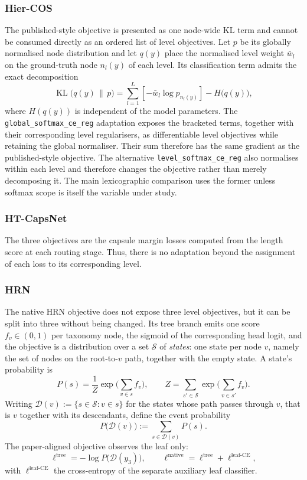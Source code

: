 \subsubsection{Hier-COS}
The published-style objective is presented
as one node-wide KL term and cannot be consumed directly as an ordered list of
level objectives. Let $p$ be its globally normalised node distribution and let
$q(y)$ place the normalised level weight $\bar w_l$ on the ground-truth node
$n_l(y)$ of each level. Its classification term admits the exact decomposition
\[
\operatorname{KL}\!\big(q(y)\,\|\,p\big)
=\sum_{l=1}^{L}\left[-\bar w_l\log p_{n_l(y)}\right]-H\!\big(q(y)\big),
\]
where $H(q(y))$ is independent of the model parameters. The
\texttt{global\_\allowbreak softmax\_\allowbreak ce\_\allowbreak reg} adaptation exposes the bracketed terms, together
with their corresponding level regularisers, as differentiable level
objectives while retaining the global normaliser. Their sum therefore has the
same gradient as the published-style objective. The alternative
\texttt{level\_softmax\_ce\_reg} also normalises within each level and therefore
changes the objective rather than merely decomposing it. The main
lexicographic comparison uses the former unless softmax scope is itself the
variable under study.

\subsubsection{HT-CapsNet}
The three objectives are the capsule margin
losses computed from the length score at each routing stage. Thus, there is no adaptation
beyond the assignment of each loss to its corresponding level.

\subsubsection{HRN}
The native HRN objective does not expose three level
objectives, but it can be split into three without being changed. Its tree
branch emits one score $f_v\in(0,1)$ per taxonomy node, the sigmoid of the
corresponding head logit, and the objective is a distribution over a set
$\mathcal{S}$ of \emph{states}: one state per node $v$, namely the set of nodes
on the root-to-$v$ path, together with the empty state. A state's probability is
\[
P(s)=\frac{1}{Z}\exp\Big(\sum_{v\in s} f_v\Big),\qquad
Z=\sum_{s'\in\mathcal{S}}\exp\Big(\sum_{v\in s'} f_{v}\Big).
\]
Writing $\mathcal{D}(v):=\{s\in\mathcal{S}:v\in s\}$ for the states whose path
passes through $v$, that is $v$ together with its descendants, define the event
probability
\[
P\bigl(\mathcal{D}(v)\bigr):=
\sum_{s\in\mathcal{D}(v)}P(s).
\]
The paper-aligned objective observes the leaf only:
\[
\ell^{\mathrm{tree}}=-\log P\big(\mathcal{D}(y_3)\big),
\qquad
\ell^{\mathrm{native}}=\ell^{\mathrm{tree}}+\ell^{\mathrm{leaf\text{-}CE}},
\]
with $\ell^{\mathrm{leaf\text{-}CE}}$ the cross-entropy of the separate
auxiliary leaf classifier.

